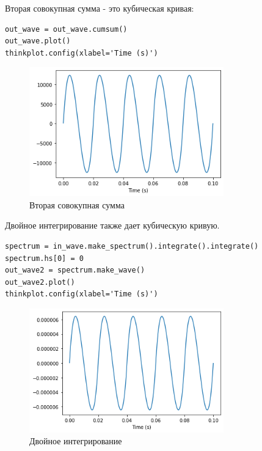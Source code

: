\documentclass[a4paper,12pt]{report}
\begin{document}
Вторая совокупная сумма - это кубическая кривая:

\begin{lstlisting}[caption=Вторая совокупная сумма]
out_wave = out_wave.cumsum()
out_wave.plot()
thinkplot.config(xlabel='Time (s)')
\end{lstlisting}

\begin{figure}[H]
        \centering
        \includegraphics[width=0.75\textwidth]{lab9_fig4_3.png}
        \caption{Вторая совокупная сумма}
        \label{fig:lab9_fig4_3}
\end{figure}

Двойное интегрирование также дает кубическую кривую.

\begin{lstlisting}[caption=Двойное интегрирование]
spectrum = in_wave.make_spectrum().integrate().integrate()
spectrum.hs[0] = 0
out_wave2 = spectrum.make_wave()
out_wave2.plot()
thinkplot.config(xlabel='Time (s)')
\end{lstlisting}

\begin{figure}[H]
        \centering
        \includegraphics[width=0.75\textwidth]{lab9_fig4_4.png}
        \caption{Двойное интегрирование}
        \label{fig:lab9_fig4_4}
\end{figure}
\end{document}
